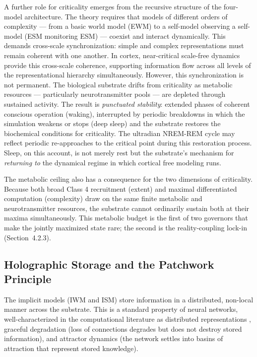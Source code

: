 \documentclass[12pt]{article}
\newcommand{\revstart}{}
\newcommand{\revend}{}
\begin{document}
A further role for criticality emerges from the recursive structure of the four-model architecture. The theory requires that models of different orders of complexity --- from a basic world model (EWM) to a self-model observing a self-model (ESM monitoring ESM) --- coexist and interact dynamically. This demands cross-scale synchronization: simple and complex representations must remain coherent with one another. In cortex, near-critical scale-free dynamics provide this cross-scale coherence, supporting information flow across all levels of the representational hierarchy simultaneously. However, this synchronization is not permanent. The biological substrate drifts from criticality as metabolic resources --- particularly neurotransmitter pools --- are depleted through sustained activity. The result is \emph{punctuated stability}: extended phases of coherent conscious operation (waking), interrupted by periodic breakdowns in which the simulation weakens or stops (deep sleep) and the substrate restores the biochemical conditions for criticality. The ultradian NREM-REM cycle may reflect periodic re-approaches to the critical point during this restoration process. Sleep, on this account, is not merely rest but the substrate's mechanism for \emph{returning to} the dynamical regime in which cortical free modeling runs.

{\revstart The metabolic ceiling also has a consequence for the two dimensions of criticality. Because both broad Class 4 recruitment (extent) and maximal differentiated computation (complexity) draw on the same finite metabolic and neurotransmitter resources, the substrate cannot ordinarily sustain both at their maxima simultaneously. This metabolic budget is the first of two governors that make the jointly maximized state rare; the second is the reality-coupling lock-in (Section~4.2.3).\revend}


\subsection{Holographic Storage and the Patchwork Principle}


The implicit models (IWM and ISM) store information in a distributed, non-local manner across the substrate. This is a standard property of neural networks, well-characterized in the computational literature as distributed representations \citep{Hinton1986}, graceful degradation (loss of connections degrades but does not destroy stored information), and attractor dynamics (the network settles into basins of attraction that represent stored knowledge).
\end{document}
